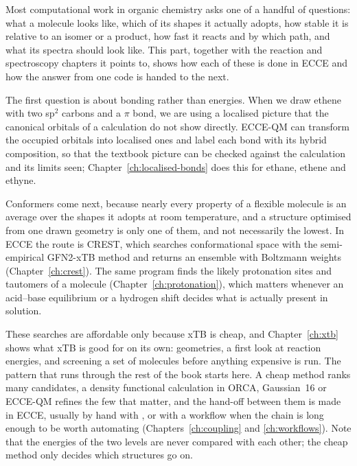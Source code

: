 
Most computational work in organic chemistry asks one of a handful of questions: what a molecule looks like, which of its shapes it actually adopts, how stable it is relative to an isomer or a product, how fast it reacts and by which path, and what its spectra should look like. This part, together with the reaction and spectroscopy chapters it points to, shows how each of these is done in ECCE and how the answer from one code is handed to the next.

The first question is about bonding rather than energies. When we draw ethene with two sp$^2$ carbons and a $\pi$ bond, we are using a localised picture that the canonical orbitals of a calculation do not show directly. ECCE-QM can transform the occupied orbitals into localised ones and label each bond with its hybrid composition, so that the textbook picture can be checked against the calculation and its limits seen; Chapter~\ref{ch:localised-bonds} does this for ethane, ethene and ethyne.

Conformers come next, because nearly every property of a flexible molecule is an average over the shapes it adopts at room temperature, and a structure optimised from one drawn geometry is only one of them, and not necessarily the lowest. In ECCE the route is CREST, which searches conformational space with the semi-empirical GFN2-xTB method and returns an ensemble with Boltzmann weights (Chapter~\ref{ch:crest}). The same program finds the likely protonation sites and tautomers of a molecule (Chapter~\ref{ch:protonation}), which matters whenever an acid--base equilibrium or a hydrogen shift decides what is actually present in solution.

These searches are affordable only because xTB is cheap, and Chapter~\ref{ch:xtb} shows what xTB is good for on its own: geometries, a first look at reaction energies, and screening a set of molecules before anything expensive is run. The pattern that runs through the rest of the book starts here. A cheap method ranks many candidates, a density functional calculation in ORCA, Gaussian~16 or ECCE-QM refines the few that matter, and the hand-off between them is made in ECCE, usually by hand with , or with a workflow when the chain is long enough to be worth automating (Chapters~\ref{ch:coupling} and \ref{ch:workflows}). Note that the energies of the two levels are never compared with each other; the cheap method only decides which structures go on.

